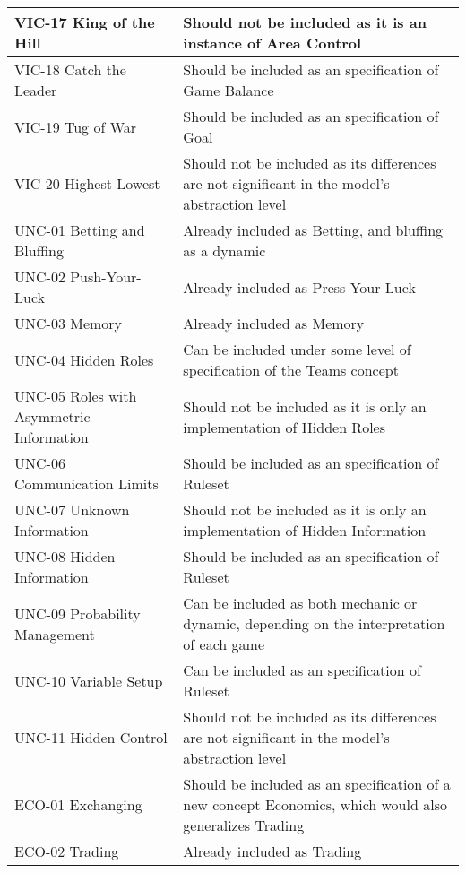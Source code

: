 \begin{longtable}{|m{7cm}|m{7cm}|}
        \hline
        VIC-17 King of the Hill & Should not be included as it is an instance of Area Control \\
        \hline
        VIC-18 Catch the Leader & Should be included as an specification of Game Balance \\
        \hline
        VIC-19 Tug of War & Should be included as an specification of Goal \\
        \hline
        VIC-20 Highest Lowest & Should not be included as its differences are not significant in the model's abstraction level \\
        \hline
        UNC-01 Betting and Bluffing & Already included as Betting, and bluffing as a dynamic \\
        \hline
        UNC-02 Push-Your-Luck & Already included as Press Your Luck \\
        \hline
        UNC-03 Memory & Already included as Memory \\
        \hline
        UNC-04 Hidden Roles & Can be included under some level of specification of the Teams concept \\
        \hline
        UNC-05 Roles with Asymmetric Information & Should not be included as it is only an implementation of Hidden Roles \\
        \hline
        UNC-06 Communication Limits & Should be included as an specification of Ruleset\\
        \hline
        UNC-07 Unknown Information & Should not be included as it is only an implementation of Hidden Information \\
        \hline
        UNC-08 Hidden Information & Should be included as an specification of Ruleset \\
        \hline
        UNC-09 Probability Management & Can be included as both mechanic or dynamic, depending on the interpretation of each game \\
        \hline
        UNC-10 Variable Setup & Can be included as an specification of Ruleset \\
        \hline
        UNC-11 Hidden Control & Should not be included as its differences are not significant in the model's abstraction level\\
        \hline
        ECO-01 Exchanging & Should be included as an specification of a new concept Economics, which would also generalizes Trading\\
        \hline
        ECO-02 Trading & Already included as Trading \\

\end{longtable}
